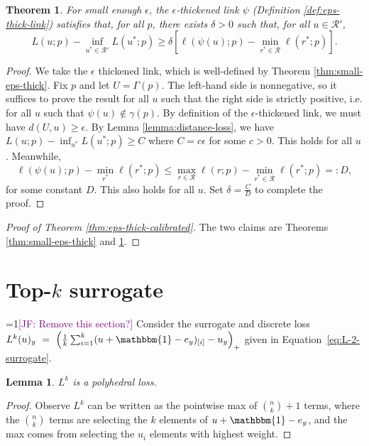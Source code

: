 \documentclass[12pt]{article}
\newcommand{\Comments}{1}
\newcommand{\mynote}[2]{\ifnum\Comments=1\textcolor{#1}{#2}\fi}
\newcommand{\jessie}[1]{\mynote{purple}{[JF: #1]}}
\newcommand{\R}{\mathcal{R}}
\newcommand{\risk}[1]{\underline{#1}}
\newcommand{\ones}{\mathbbm{1}}
\newtheorem{theorem}{Theorem}
\newtheorem{lemma}{Lemma}
\begin{document}
\begin{theorem} \label{thm:app-eps-thick-sep}
  For small enough $\epsilon$, the $\epsilon$-thickened link $\psi$ (Definition \ref{def:eps-thick-link}) satisfies that, for all $p$, there exists $\delta > 0$ such that, for all $u \in \R'$,
    \[ L(u;p) - \inf_{u^* \in \R'} L(u^*;p) \geq \delta \left[ \ell(\psi(u);p) - \min_{r^* \in \R} \ell(r^*;p) \right] . \]
\end{theorem}
\begin{proof}
  We take the $\epsilon$ thickened link, which is well-defined by Theorem \ref{thm:small-eps-thick}.
  Fix $p$ and let $U = \Gamma(p)$.
  The left-hand side is nonnegative, so it suffices to prove the result for all $u$ such that the right side is strictly positive, i.e. for all $u$ such that $\psi(u) \not\in \gamma(p)$.
  By definition of the $\epsilon$-thickened link, we must have $d(U,u) \geq \epsilon$.
  By Lemma \ref{lemma:distance-loss}, we have $L(u;p) - \inf_{u^*} L(u^*;p) \geq C$ where $C = c\epsilon$ for some $c > 0$.
  This holds for all $u$.
  Meanwhile,
    \[ \ell(\psi(u);p) - \min_{r^*} \ell(r^*;p) \leq \max_{r \in \R} \ell(r;p) - \min_{r^* \in \R} \ell(r^*;p) =: D, \]
  for some constant $D$.
  This also holds for all $u$.
  Set $\delta = \frac{C}{D}$ to complete the proof.
\end{proof}

\begin{proof}[Proof of Theorem \ref{thm:eps-thick-calibrated}]
  The two claims are Theorems \ref{thm:small-eps-thick} and \ref{thm:app-eps-thick-sep}.
\end{proof}


\section{Top-$k$ surrogate} 
\jessie{Remove this section?}
Consider the surrogate and discrete loss $L^k(u)_y~=~\left(\frac{1}{k} \sum_{i=1}^k (u + \ones - e_y)_{[i]} - u_y \right)_+$ given in Equation~\ref{eq:L-2-surrogate}.

\begin{lemma}\label{lem:top-k-polyhedral}
$L^k$ is a polyhedral loss.
\end{lemma}
\begin{proof}
Observe $L^k$ can be written as the pointwise max of $\binom{n}{k} +1$ terms, where the $\binom{n}{k}$ terms are selecting the $k$ elements of $u + \ones - e_y$, and the max comes from selecting the $u_i$ elements with highest weight.
\end{proof}
\end{document}
